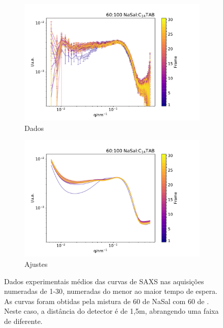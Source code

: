 	\begin{figure}[h]
		\begin{subfigure}[t]{0.5\textwidth}
			\centering
			\includegraphics[width=\textwidth]{imagens/saxs/TR_saxs_60_100_15_dados.pdf}
			\caption{Dados}
			\label{fig:saxs_tr_60_15_d}
		\end{subfigure}%
		\begin{subfigure}[t]{0.5\textwidth}
			\centering
			\includegraphics[width=\textwidth]{imagens/saxs/TR_saxs_60_100_15_ajustes.pdf}
			\caption{Ajustes}
			\label{fig:saxs_tr_60_15_a}
		\end{subfigure}
		\caption{Dados experimentais médios das curvas de SAXS nas aquisições numeradas de 1-30, numeradas do menor ao maior tempo de espera. As curvas foram obtidas pela mistura de 60 \mM{} de NaSal com 60 \mM{} de \TTAB. Neste caso, a distância do detector é de 1,5m, abrangendo uma faixa de \q{} diferente.}
		\label{fig:saxs_tr_60_15}
	\end{figure} 
	
